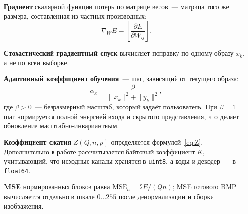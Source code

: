 \textbf{Градиент} скалярной функции потерь по матрице весов~--- матрица того же размера, составленная из частных производных:
\begin{equation}
	\nabla_W E = \left[\frac{\partial E}{\partial W_{ij}}\right].
\end{equation}

\textbf{Стохастический градиентный спуск} вычисляет поправку по одному образу $x_k$, а не по всей выборке.

\textbf{Адаптивный коэффициент обучения}~--- шаг, зависящий от текущего образа:
\begin{equation}
	\alpha_k = \frac{\beta}{\|x_k\|^2 + \|y_k\|^2},
	\label{eq:alpha}
\end{equation}
где $\beta>0$~--- безразмерный масштаб, который задаёт пользователь. При $\beta=1$ шаг нормируется полной энергией входа и скрытого представления, что делает обновление масштабно-инвариантным.

\textbf{Коэффициент сжатия} $Z(Q,n,p)$ определяется формулой~\eqref{eq:Z}. Дополнительно в работе рассчитывается байтовый коэффициент $K$, учитывающий, что исходные каналы хранятся в \texttt{uint8}, а коды и декодер~--- в \texttt{float64}.

\textbf{MSE} нормированных блоков равна $\mathrm{MSE}_n = 2E/(Qn)$; MSE готового BMP вычисляется отдельно в шкале $0\ldots255$ после денормализации и сборки изображения.
